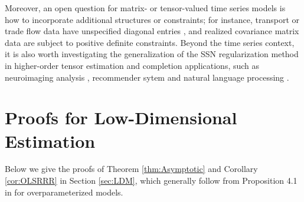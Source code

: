 \documentclass[12pt]{article}
\begin{document}
Moreover, an open question for matrix- or tensor-valued time series models is how to incorporate additional structures or constraints; for instance, transport or  trade flow data have unspecified diagonal entries \citep{chen2019modeling}, and realized covariance matrix data are subject to positive definite constraints.  Beyond the time series context, it is also worth investigating the generalization of the SSN regularization method in higher-order tensor estimation and completion applications, such as neuroimaging analysis \citep{li2018tucker}, recommender sytem \citep{bi2018multilayer} and natural language processing \citep{frandsen2019understanding}. 


\clearpage
\newpage

\renewcommand{\thesection}{Appendix A:}
\renewcommand{\theequation}{A.\arabic{equation}}
\setcounter{equation}{0} 

\section{Proofs for Low-Dimensional Estimation}
Below we give the proofs of Theorem \ref{thm:Asymptotic} and Corollary \ref{cor:OLSRRR} in Section \ref{sec:LDM}, which generally follow from Proposition 4.1 in \citet{shapiro1986asymptotic} for overparameterized models.
\end{document}
